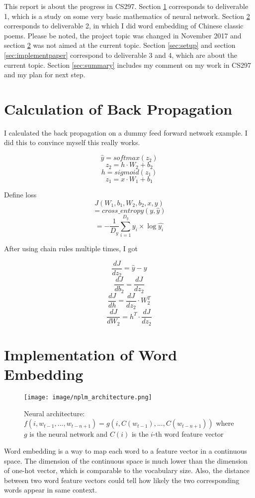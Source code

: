 \documentclass[12pt]{article}
\begin{document}
This report is about the progress in CS297. Section \ref{sec:calculation}  corresponds to deliverable 1, which is a study on some very basic mathematics of neural network. Section \ref{sec:embdding} corresponds to deliverable 2, in which I did word embedding of Chinese classic poems. Please be noted, the project topic was changed in November 2017 and section \ref{sec:embdding} was not aimed at the current topic. Section \ref{sec:setup} and section \ref{sec:implementpaper} correspond to deliverable 3 and 4, which are about the current topic. Section \ref{sec:summary} includes my comment on my work in CS297 and my plan for next step.

\break

\section{Calculation of Back Propagation}\label{sec:calculation}

I calculated the back propagation on a dummy feed forward network example. I did this to convince myself this really works.


$$\hat{y}=softmax(z_2)$$
$$z_2=h\cdot W_2 + b_2$$
$$h=sigmoid(z_1)$$
$$z_1=x\cdot W_1+b_1$$

Define loss
$$J(W_1, b_1, W_2, b_2, x, y)$$
$$=cross\_entropy(y, \hat{y})$$
$$=-\frac{1}{D_y}\sum_{i=1}^{D_y}y_i \times \log{\hat{y_i}} $$

After using chain rules multiple times, I got

$$\frac{dJ}{dz_2}=\hat{y} - y$$
$$\frac{dJ}{db_2}=\frac{dJ}{dz_2}$$
$$\frac{dJ}{dh}=\frac{dJ}{dz_2}\cdot W_2^T$$
$$\frac{dJ}{dW_2}=h^T \cdot \frac{dJ}{dz_2}$$

\break

\section{Implementation of Word Embedding}\label{sec:embdding}

\begin{figure}[h]
\texttt{[image: image/nplm\_architecture.png]}
\centering
\caption{Neural architecture: $f(i,w_{t-1},... ,w_{t-n+1}) =g(i,C(w_{t-1}),... ,C(w_{t-n+1}))$ where $g$ is the neural network and $C(i)$ is the $i$-th word feature vector\cite{bengio2003neural}}
\label{fig:nplm}
\end{figure}

Word embedding is a way to map each word to a feature vector in a continuous space. The dimension of the continuous space is much lower than the dimension of one-hot vector, which is comparable to the vocabulary size. Also, the distance between two word feature vectors could tell how likely the two corresponding words appear in same context.
\end{document}
